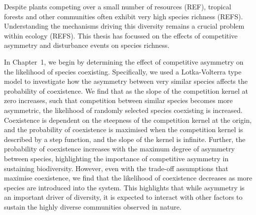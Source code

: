 
Despite plants competing over a small number of resources (REF), tropical forests and other communities often exhibit very high species richness (REFS). Understanding the mechanisms driving this diversity remains a crucial problem within ecology (REFS). This thesis has focussed on the effects of competitive asymmetry and disturbance events on species richness.

In Chapter~1, we begin by determining the effect of competitive asymmetry on the likelihood of species coexisting. Specifically, we used a Lotka-Volterra type model to investigate how the asymmetry between very similar species affects the probability of coexistence. We find that as the slope of the competition kernel at zero increases, such that competition between similar species becomes more asymmetric, the likelihood of randomly selected species coexisting is increased. Coexistence is dependent on the steepness of the competition kernel at the origin, and the probability of coexistence is maximised when the competition kernel is described by a step function, and the slope of the kernel is infinite. Further, the probability of coexistence increases with the maximum degree of asymmetry between species, highlighting the importance of competitive asymmetry in sustaining biodiversity. However, even with the trade-off assumptions that maximise coexistence, we find that the likelihood of coexistence decreases as more species are introduced into the system. This highlights that while asymmetry is an important driver of diversity, it is expected to interact with other factors to sustain the highly diverse communities observed in nature.

